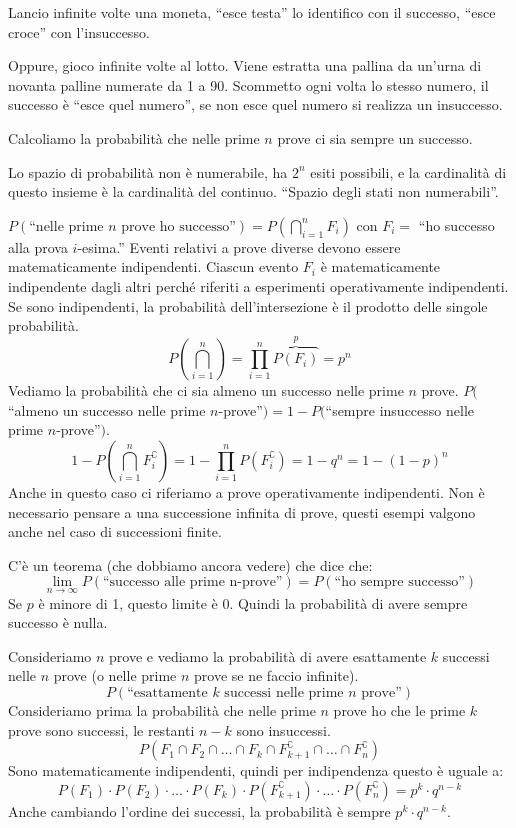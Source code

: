 \begin{exmp}
Lancio infinite volte una moneta, ``esce testa'' lo identifico con il successo, ``esce croce'' con l'insuccesso.

Oppure, gioco infinite volte al lotto. Viene estratta una pallina da un'urna di novanta palline numerate da 1 a 90. Scommetto ogni volta lo stesso numero, il successo \`e ``esce quel numero'', se non esce quel numero si realizza un insuccesso.

Calcoliamo la probabilit\`a che nelle prime $n$ prove ci sia sempre un successo.

Lo spazio di probabilit\`a non \`e numerabile, ha $2^n$ esiti possibili, e la cardinalit\`a di questo insieme \`e la cardinalit\`a del continuo. ``Spazio degli stati non numerabili''.

$P(\text{``nelle prime $n$ prove ho successo''}) = P( \bigcap_{i=1}^{n} F_i )$ con $F_i =$ ``ho successo alla prova $i$-esima.'' Eventi relativi a prove diverse devono essere matematicamente indipendenti. Ciascun evento $F_i$ \`e matematicamente indipendente dagli altri perch\'e riferiti a esperimenti operativamente indipendenti. Se sono indipendenti, la probabilit\`a dell'intersezione \`e il prodotto delle singole probabilit\`a.
\[
P \left( \bigcap_{i=1}^{n} \right) = \prod_{i=1}^{n} \overbrace{P(F_i)}^{p} = p^n
\]
Vediamo la probabilit\`a che ci sia almeno un successo nelle prime $n$ prove. $P($``almeno un successo nelle prime $n$-prove''$) = 1 -  P($``sempre insuccesso nelle prime $n$-prove''$)$.
\[
1 - P \left( \bigcap_{i=1}^{n} F_{i}^{\complement} \right) = 1 - \prod_{i=1}^{n} P(F_{i}^{\complement}) = 1 - q^n = 1 - (1 - p)^{n}
\]
Anche in questo caso ci riferiamo a prove operativamente indipendenti. Non \`e necessario pensare a una successione infinita di prove, questi esempi valgono anche nel caso di successioni finite.
\end{exmp}

C'\`e un teorema (che dobbiamo ancora vedere) che dice che:
\[
\lim_{n \to \infty} P(\text{``successo alle prime n-prove''}) = P(\text{``ho sempre successo''})
\]
Se $p$ \`e minore di 1, questo limite \`e 0. Quindi la probabilit\`a di avere sempre successo \`e nulla.

Consideriamo $n$ prove e vediamo la probabilit\`a di avere esattamente $k$ successi nelle $n$ prove (o nelle prime $n$ prove se ne faccio infinite).
\[
P(\text{``esattamente $k$ successi nelle prime $n$ prove''})
\]
Consideriamo prima la probabilit\`a che nelle prime $n$ prove ho che le prime $k$ prove sono successi, le restanti $n - k$ sono insuccessi.
\[
P(F_1 \cap F_2 \cap \dots \cap F_k \cap F_{k+1}^{\complement} \cap \dots \cap F_{n}^{\complement})
\]
Sono matematicamente indipendenti, quindi per indipendenza questo \`e uguale a:
\[
P(F_1) \cdot P(F_2) \cdot \ldots \cdot P(F_k) \cdot P(F_{k+1}^{\complement}) \cdot \ldots \cdot P(F_{n}^{\complement}) = p^{k} \cdot q^{n-k}
\]
Anche cambiando l'ordine dei successi, la probabilit\`a \`e sempre $p^k \cdot q^{n-k}$.


